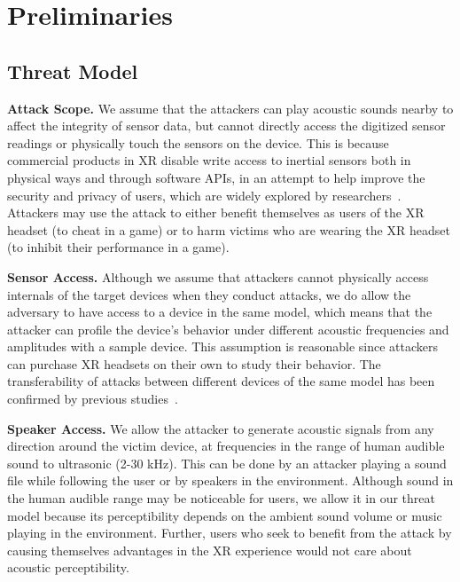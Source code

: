 \section{Preliminaries} \label{sec:prelim}

\subsection{Threat Model}

\textbf{Attack Scope.} We assume that the attackers can play acoustic sounds nearby to affect the integrity of sensor data, but cannot directly access the digitized sensor readings or physically touch the sensors on the device. This is because commercial products in XR disable write access to inertial sensors both in physical ways and through software APIs, in an attempt to help improve the security and privacy of users, which are widely explored by researchers~\cite{michalevsky2014gyrophone,aviv2012practicality,owusu2012accessory,dey2014accelprint,marquardt2011sp}.
Attackers may use the attack to either benefit themselves as users of the XR headset (\eg to cheat in a game) or to harm victims who are wearing the XR headset (\eg to inhibit their performance in a game).

\textbf{Sensor Access.} Although we assume that attackers cannot physically access internals of the target devices when they conduct attacks, we do allow the adversary to have access to a device in the same model, which means that the attacker can profile the device's behavior under different acoustic frequencies and amplitudes with a sample device. This assumption is reasonable since attackers can purchase XR headsets on their own to study their behavior. The transferability of attacks between different devices of the same model has been confirmed by previous studies~\cite{trippel2017walnut}. 

\textbf{Speaker Access.} We allow the attacker to generate acoustic signals from any direction around the victim device, at frequencies in the range of human audible sound to ultrasonic (2-30 kHz). This can be done by an attacker playing a sound file while following the user or by speakers in the environment.
Although sound in the human audible range may be noticeable for users, we allow it in our threat model because its perceptibility depends on the ambient sound volume or music playing in the environment.
Further, users who seek to benefit from the attack by causing themselves advantages in the XR experience would not care about acoustic perceptibility.

